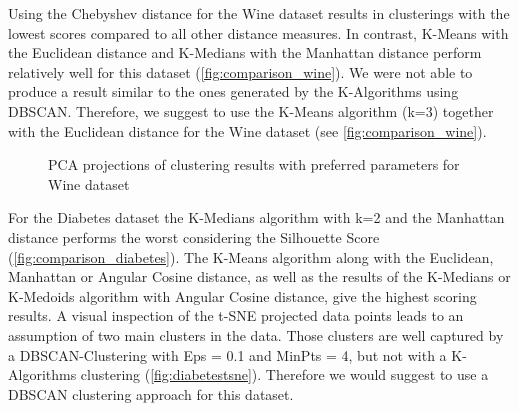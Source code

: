 Using the Chebyshev distance for the Wine dataset results in clusterings with the lowest scores compared to all other distance measures. In contrast, K-Means with the Euclidean distance and K-Medians with the Manhattan distance perform relatively well for this dataset (\autoref{fig:comparison_wine}). 
We were not able to produce a result similar to the ones generated by the K-Algorithms using DBSCAN.
Therefore, we suggest to use the K-Means algorithm (k=3) together with the Euclidean distance for the Wine dataset (see \autoref{fig:comparison_wine}). 

\begin{figure}[H]
	\centering
	\caption{PCA projections of clustering results with preferred parameters for Wine dataset}
	\label{fig:wine_bestparams}
\end{figure}

For the Diabetes dataset the K-Medians algorithm with k=2 and the Manhattan distance performs the worst considering the Silhouette Score (\autoref{fig:comparison_diabetes}). The K-Means algorithm along with the Euclidean, Manhattan or Angular Cosine distance, as well as the results of the K-Medians or K-Medoids algorithm with Angular Cosine distance, give the highest scoring results. A visual inspection of the t-SNE projected data points leads to an assumption of two main clusters in the data. Those clusters are well captured by a DBSCAN-Clustering with Eps = 0.1 and MinPts = 4, but not with a K-Algorithms clustering (\autoref{fig:diabetestsne}). Therefore we would suggest to use a DBSCAN clustering approach for this dataset. 

